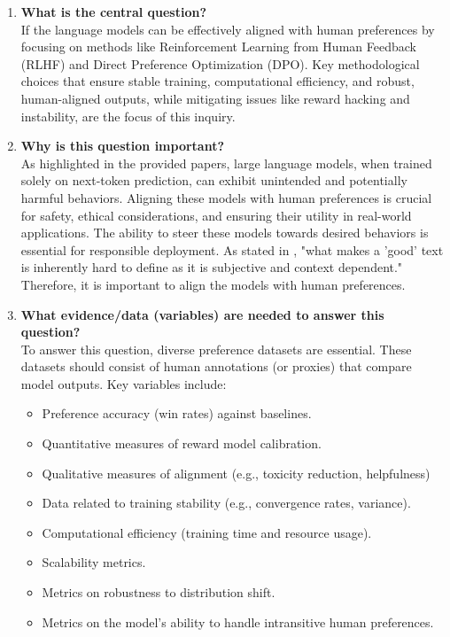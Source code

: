 \documentclass[a4paper,oneside,10pt,ngerman,english]{scrartcl}
\begin{document}
\begin{enumerate}
    \item \textbf{What is the central question?} \\
    If the language models can be effectively aligned with human preferences by focusing on methods like Reinforcement Learning from Human Feedback (RLHF) and Direct Preference Optimization (DPO). Key methodological choices that ensure stable training, computational efficiency, and robust, human-aligned outputs, while mitigating issues like reward hacking and instability, are the focus of this inquiry.

    \item \textbf{Why is this question important?} \\
    As highlighted in the provided papers, large language models, when trained solely on next-token prediction, can exhibit unintended and potentially harmful behaviors. Aligning these models with human preferences is crucial for safety, ethical considerations, and ensuring their utility in real-world applications. The ability to steer these models towards desired behaviors is essential for responsible deployment. As stated in \cite{lambert2022illustrating}, "what makes a 'good' text is inherently hard to define as it is subjective and context dependent." Therefore, it is important to align the models with human preferences.

    \item \textbf{What evidence/data (variables) are needed to answer this question?} \\
    To answer this question, diverse preference datasets are essential. These datasets should consist of human annotations (or proxies) that compare model outputs. Key variables include:
    \begin{itemize}
        \item Preference accuracy (win rates) against baselines.
        \item Quantitative measures of reward model calibration.
        \item Qualitative measures of alignment (e.g., toxicity reduction, helpfulness)
        \item Data related to training stability (e.g., convergence rates, variance).
        \item Computational efficiency (training time and resource usage).
        \item Scalability metrics.
        \item Metrics on robustness to distribution shift. 
        \item Metrics on the model's ability to handle intransitive human preferences. 
    \end{itemize}


\end{enumerate}
\end{document}

